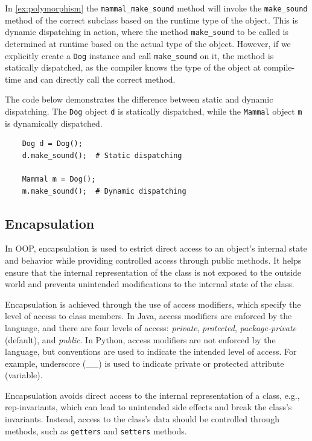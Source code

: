 \documentclass[oneside,11pt,dvipsnames]{book}
\newcommand{\code}[1]{\texttt{#1}}
\begin{document}
In \autoref{ex:polymorphism} the \code{mammal\_make\_sound} method will invoke the \code{make\_sound} method of the correct subclass based on the runtime type of the object. This is dynamic dispatching in action, where the method \code{make\_sound} to be called is determined at runtime based on the actual type of the object.  However, if we explicitly create a \code{Dog} instance and call \code{make\_sound} on it, the method is statically dispatched, as the compiler knows the type of the object at compile-time and can directly call the correct method.

The code below demonstrates the difference between static and dynamic dispatching. The \code{Dog} object \code{d} is statically dispatched, while the \code{Mammal} object \code{m} is dynamically dispatched.
\begin{lstlisting}
    Dog d = Dog();
    d.make_sound();  # Static dispatching

    Mammal m = Dog();
    m.make_sound();  # Dynamic dispatching
\end{lstlisting}    

\subsection{Encapsulation}

In OOP, encapsulation is used to estrict direct access to an object's internal state and behavior while providing controlled access through public methods. It helps ensure that the internal representation of the class is not exposed to the outside world and prevents unintended modifications to the internal state of the class.

Encapsulation is achieved through the use of access modifiers, which specify the level of access to class members. In Java, access modifiers are enforced by the language, and there are four levels of access: \emph{private}, \emph{protected}, \emph{package-private} (default), and \emph{public}.  In Python, access modifiers are not enforced by the language, but conventions are used to indicate the intended level of access. For example, underscore (\_\_) is used to indicate private or protected attribute (variable). 

Encapsulation avoids direct access to the internal representation of a class, e.g., rep-invariants, which can lead to unintended side effects and break the class's invariants. Instead, access to the class's data should be controlled through methods, such as \code{getters} and \code{setters} methods.
\end{document}
